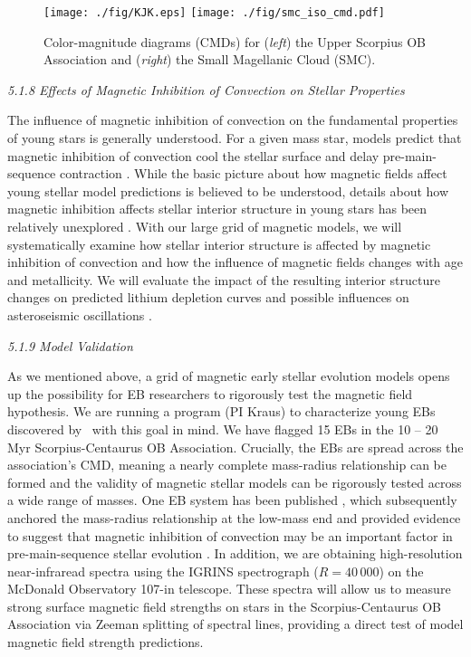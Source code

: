 \begin{figure}[t]
	\centering
	\texttt{[image: ./fig/KJK.eps]} \hspace{\fill}
	\texttt{[image: ./fig/smc\_iso\_cmd.pdf]}
	\caption{Color-magnitude diagrams (CMDs) for ({\it left}) the Upper Scorpius OB Association and ({\it right}) the Small Magellanic Cloud (SMC). }
	\label{fig:smc}
	\vspace{-0.2in}
\end{figure}

{\it 5.1.8 Effects of Magnetic Inhibition of Convection on Stellar Properties}

The influence of magnetic inhibition of convection on the fundamental properties of young stars is generally understood. For a given mass star, models predict that magnetic inhibition of convection cool the stellar surface and delay pre-main-sequence contraction \citep{DAntona2000, MM10, Malo2014, Feiden2016}. While the basic picture about how magnetic fields affect young stellar model predictions is believed to be understood, details about how magnetic inhibition affects stellar interior structure in young stars  has been relatively unexplored \citep[e.g., on radiative core development;][]{Feiden2016}. With our large grid of magnetic models, we will systematically examine how stellar interior structure is affected by magnetic inhibition of convection and how the influence of magnetic fields changes with age and metallicity. We will evaluate the impact of the resulting interior structure changes on predicted lithium depletion curves \citep[see, e.g.,][]{Malo2014} and possible influences on asteroseismic oscillations \citep{Zwintz2014}.


{\it 5.1.9 Model Validation}

As we mentioned above, a grid of magnetic early stellar evolution models opens up the possibility for EB researchers to rigorously test the magnetic field hypothesis. We are running a program (PI Kraus) to characterize young EBs discovered by \kepler\ with this goal in mind. We have flagged 15 EBs in the 10 -- 20 Myr Scorpius-Centaurus OB Association. Crucially, the EBs are spread across the association's CMD, meaning a nearly complete mass-radius relationship can be formed and the validity of magnetic stellar models can be rigorously tested across a wide range of masses. One EB system has been published \citep[UScoCTIO 5;][]{Kraus2015}, which subsequently anchored the mass-radius relationship at the low-mass end and provided evidence to suggest that magnetic inhibition of convection may be an important factor in pre-main-sequence stellar evolution \citep{Feiden2016}. In addition, we are obtaining high-resolution near-infraread spectra using the IGRINS spectrograph ($R = 40\,000$) on the McDonald Observatory 107-in telescope. These spectra will allow us to measure strong surface magnetic field strengths on stars in the Scorpius-Centaurus OB Association via Zeeman splitting of spectral lines, providing a direct test of model magnetic field strength predictions.

